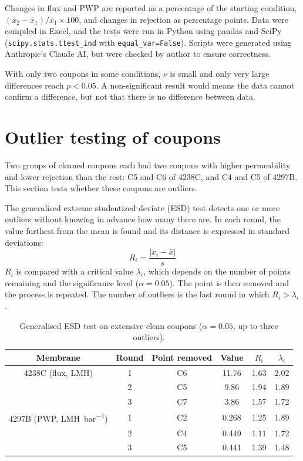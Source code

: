 Changes in flux and PWP are reported as a percentage of the starting condition, $(\bar{x}_2 - \bar{x}_1)/\bar{x}_1 \times 100$, and changes in rejection as percentage points. Data were compiled in Excel, and the tests were run in Python using pandas and SciPy (\texttt{scipy.stats.ttest\_ind} with \texttt{equal\_var=False}). Scripts were generated using Anthropic's Claude AI, but were checked by author to ensure correctness. 

With only two coupons in some conditions, $\nu$ is small and only very large differences reach $p < 0.05$. A non-significant result would means the data cannot confirm a difference, but not that there is no difference between data.

\section{Outlier testing of coupons}
\label{app:outliers}
Two groups of cleaned coupons each had two coupons with higher permeability and lower rejection than the rest: C5 and C6 of 4238C, and C4 and C5 of 4297B. This section tests whether these coupons are outliers.

The generalised extreme studentized deviate (ESD) test \citep{Rosner1983} detects one or more outliers without knowing in advance how many there are. In each round, the value furthest from the mean is found and its distance is expressed in standard deviations:
\begin{equation}
R_i = \frac{\lvert x_i - \bar{x} \rvert}{s}
\end{equation}
$R_i$ is compared with a critical value $\lambda_i$, which depends on the number of points remaining and the significance level ($\alpha = 0.05$). The point is then removed and the process is repeated. The number of outliers is the last round in which $R_i > \lambda_i$.

\begin{table}[htbp]
\centering
\caption{Generalised ESD test on extensive clean coupons ($\alpha = 0.05$, up to three outliers).}
\label{tab:esd}
\begin{tabular}{cccccc}
\toprule
Membrane & Round & Point removed & Value & $R_i$ & $\lambda_i$ \\
\midrule
4238C (flux, \unit{LMH}) & 1 & C6 & 11.76 & 1.63 & 2.02 \\
 & 2 & C5 & 9.86 & 1.94 & 1.89 \\
 & 3 & C7 & 3.86 & 1.57 & 1.72 \\
\midrule
4297B (PWP, \unit{LMH.bar^{-1}}) & 1 & C2 & 0.268 & 1.25 & 1.89 \\
 & 2 & C4 & 0.449 & 1.11 & 1.72 \\
 & 3 & C5 & 0.441 & 1.39 & 1.48 \\
\bottomrule
\end{tabular}
\end{table}

